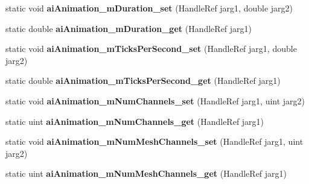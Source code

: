 \begin{DoxyCompactItemize}
\item 
\hypertarget{class_assimp_p_i_n_v_o_k_e_a0e101f1ac19cc06259522fefe20b1e88}{static void {\bfseries ai\+Animation\+\_\+m\+Duration\+\_\+set} (Handle\+Ref jarg1, double jarg2)}\label{class_assimp_p_i_n_v_o_k_e_a0e101f1ac19cc06259522fefe20b1e88}

\item 
\hypertarget{class_assimp_p_i_n_v_o_k_e_a555be52cd54983adbb66e3f0633cb896}{static double {\bfseries ai\+Animation\+\_\+m\+Duration\+\_\+get} (Handle\+Ref jarg1)}\label{class_assimp_p_i_n_v_o_k_e_a555be52cd54983adbb66e3f0633cb896}

\item 
\hypertarget{class_assimp_p_i_n_v_o_k_e_a79e81e121973966b9a45782b65be9e5f}{static void {\bfseries ai\+Animation\+\_\+m\+Ticks\+Per\+Second\+\_\+set} (Handle\+Ref jarg1, double jarg2)}\label{class_assimp_p_i_n_v_o_k_e_a79e81e121973966b9a45782b65be9e5f}

\item 
\hypertarget{class_assimp_p_i_n_v_o_k_e_a3c2333eb6e067c1f8f71068524ad9946}{static double {\bfseries ai\+Animation\+\_\+m\+Ticks\+Per\+Second\+\_\+get} (Handle\+Ref jarg1)}\label{class_assimp_p_i_n_v_o_k_e_a3c2333eb6e067c1f8f71068524ad9946}

\item 
\hypertarget{class_assimp_p_i_n_v_o_k_e_ac2ea6124f0ace143e54041225ba25e3b}{static void {\bfseries ai\+Animation\+\_\+m\+Num\+Channels\+\_\+set} (Handle\+Ref jarg1, uint jarg2)}\label{class_assimp_p_i_n_v_o_k_e_ac2ea6124f0ace143e54041225ba25e3b}

\item 
\hypertarget{class_assimp_p_i_n_v_o_k_e_adc06576dd42492210283e9506c694f1b}{static uint {\bfseries ai\+Animation\+\_\+m\+Num\+Channels\+\_\+get} (Handle\+Ref jarg1)}\label{class_assimp_p_i_n_v_o_k_e_adc06576dd42492210283e9506c694f1b}

\item 
\hypertarget{class_assimp_p_i_n_v_o_k_e_a60fa7e89e85629b59732bd7ea37adbe9}{static void {\bfseries ai\+Animation\+\_\+m\+Num\+Mesh\+Channels\+\_\+set} (Handle\+Ref jarg1, uint jarg2)}\label{class_assimp_p_i_n_v_o_k_e_a60fa7e89e85629b59732bd7ea37adbe9}

\item 
\hypertarget{class_assimp_p_i_n_v_o_k_e_a3eb4bb8369fd0dc868bd07364305c839}{static uint {\bfseries ai\+Animation\+\_\+m\+Num\+Mesh\+Channels\+\_\+get} (Handle\+Ref jarg1)}\label{class_assimp_p_i_n_v_o_k_e_a3eb4bb8369fd0dc868bd07364305c839}


\end{DoxyCompactItemize}
